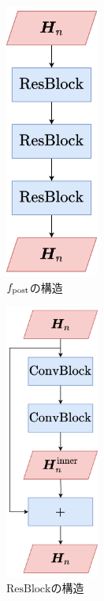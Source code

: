 \begin{figure}[tb]
    \centering
    \begin{subfigure}[b]{0.32\textwidth}
        \centering
        \includegraphics[height=90mm]{./figure/sec4/model_2/post.drawio.png}
        \caption{$f_{\text{post}}$の構造}
        \label{sec4:fig:post}
    \end{subfigure}
    \hfill
    \begin{subfigure}[b]{0.32\textwidth}
        \centering
        \includegraphics[height=90mm]{./figure/sec4/model_2/post_resblock.drawio.png}
        \caption{$\text{ResBlock}$の構造}
        \label{sec4:fig:post_resblock}
    \end{subfigure}
    \hfill
    \begin{subfigure}[b]{0.32\textwidth}
        \centering

\end{subfigure}
\end{figure}
